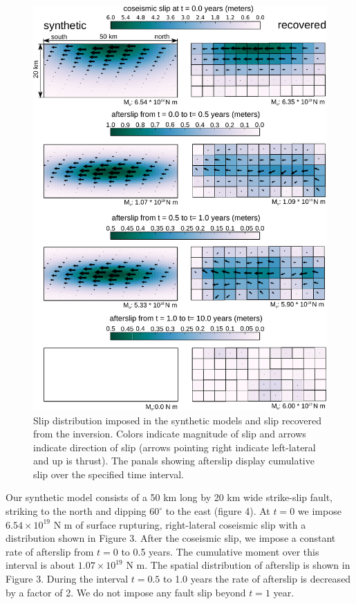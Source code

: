 \documentclass[extra]{gji}
\begin{document}
\begin{figure}\label{figure3}
  \centering
  \includegraphics[scale=0.6]{FinalFigures/Figure2.pdf}
  \caption{Slip distribution imposed in the synthetic models and slip
    recovered from the inversion. Colors indicate magnitude of slip
    and arrows indicate direction of slip (arrows pointing right
    indicate left-lateral and up is thrust).  The panals showing
    afterslip display cumulative slip over the specified time
    interval.}
  \label{Figure 3}
\end{figure}

Our synthetic model consists of a 50 km long by 20 km wide strike-slip
fault, striking to the north and dipping $60^{\circ}$ to the east (figure
4). At $t=0$ we impose $6.54\times 10^{19}$ N m of surface rupturing,
right-lateral coseismic slip with a distribution shown in Figure 3.
After the coseismic slip, we impose a constant rate of afterslip from
$t=0$ to 0.5 years.  The cumulative moment over this
interval is about $1.07\times 10^{19}$ N m.  The spatial distribution of
afterslip is shown in Figure 3.  During the interval $t=0.5$ to
1.0 years the rate of afterslip is decreased by a factor of 2.
We do not impose any fault slip beyond $t=1$ year.
\end{document}
